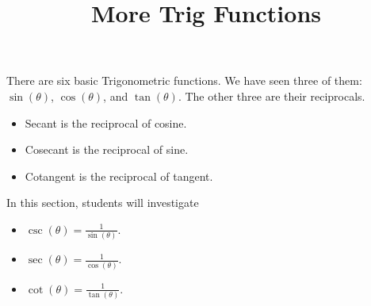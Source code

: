 \documentclass{ximera}
\title{More Trig Functions}
\begin{document}
\begin{abstract}
%
\end{abstract}
\maketitle



There are six basic Trigonometric functions.  We have seen three of them: $\sin(\theta)$, $\cos(\theta)$, and $\tan(\theta)$. The other three are their reciprocals.


\begin{itemize}
\item Secant is the reciprocal of cosine.
\item Cosecant is the reciprocal of sine.
\item Cotangent is the reciprocal of tangent.
\end{itemize}







\begin{sectionOutcomes}
In this section, students will investigate

\begin{itemize}
\item $\csc(\theta) = \frac{1}{\sin(\theta)}$.
\item $\sec(\theta) = \frac{1}{\cos(\theta)}$.
\item $\cot(\theta) = \frac{1}{\tan(\theta)}$.
\end{itemize}
\end{sectionOutcomes}
\end{document}
